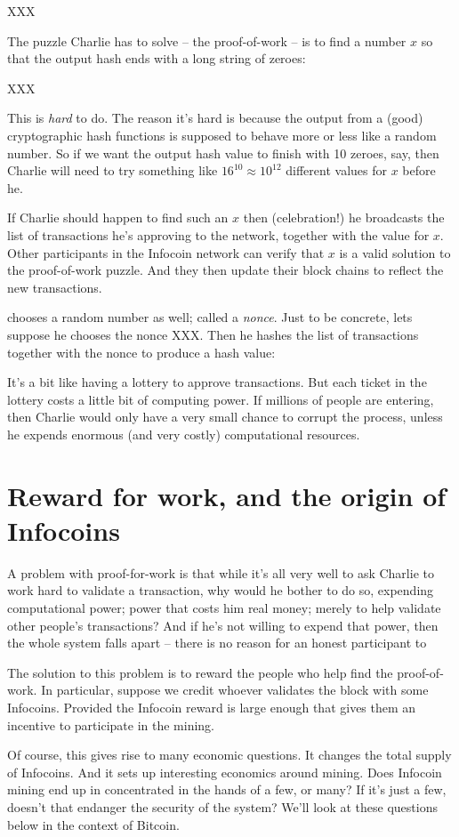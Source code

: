 \documentclass[12pt]{book}
\newcounter{problem}[chapter]
\begin{document}
XXX

The puzzle Charlie has to solve -- the proof-of-work -- is to find a
number $x$ so that the output hash ends with a long string of zeroes:

XXX

This is \emph{hard} to do.  The reason it's hard is because the output
from a (good) cryptographic hash functions is supposed to behave more
or less like a random number.  So if we want the output hash value to
finish with 10 zeroes, say, then Charlie will need to try something
like $16^{10} \approx 10^{12}$ different values for $x$ before he.

If Charlie should happen to find such an $x$ then (celebration!)  he
broadcasts the list of transactions he's approving to the network,
together with the value for $x$.  Other participants in the Infocoin
network can verify that $x$ is a valid solution to the proof-of-work
puzzle.  And they then update their block chains to reflect the new
transactions.


chooses a random number as well; called
a \emph{nonce}.  Just to be concrete, lets suppose he chooses the
nonce XXX.  Then he hashes the list of transactions together with the
nonce to produce a hash value:


It's a bit like having a lottery to approve transactions.  But each
ticket in the lottery costs a little bit of computing power.  If
millions of people are entering, then Charlie would only have a very
small chance to corrupt the process, unless he expends enormous (and
very costly) computational resources.

\section{Reward for work, and the origin of Infocoins}

A problem with proof-for-work is that while it's all very well to ask
Charlie to work hard to validate a transaction, why would he bother to
do so, expending computational power; power that costs him real money;
merely to help validate other people's transactions?  And if he's not
willing to expend that power, then the whole system falls apart --
there is no reason for an honest participant to

The solution to this problem is to reward the people who help find the
proof-of-work.  In particular, suppose we credit whoever validates the
block with some Infocoins.  Provided the Infocoin reward is large
enough that gives them an incentive to participate in the mining.

Of course, this gives rise to many economic questions.  It changes the
total supply of Infocoins.  And it sets up interesting economics
around mining.  Does Infocoin mining end up in concentrated in the
hands of a few, or many?  If it's just a few, doesn't that endanger
the security of the system?  We'll look at these questions below in
the context of Bitcoin.  
\end{document}

